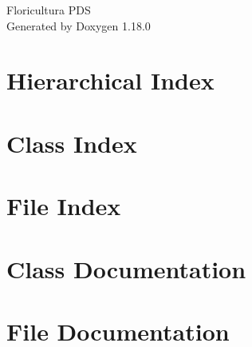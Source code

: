 \documentclass[twoside]{book}
\newcommand{\+}{\discretionary{\mbox{\scriptsize$\hookleftarrow$}}{}{}}
\newcommand{\clearemptydoublepage}{%
    \newpage{\pagestyle{empty}\cleardoublepage}%
  }
\begin{document}
  \raggedbottom
    \hypersetup{pageanchor=false,
                bookmarksnumbered=true,
                pdfencoding=unicode
               }
  \begin{titlepage}
  \vspace*{7cm}
  \begin{center}%
  {\Large Floricultura PDS}\\
  \vspace*{1cm}
  {\large Generated by Doxygen 1.18.0}\\
  \end{center}
  \end{titlepage}
  \clearemptydoublepage
  \tableofcontents
  \clearemptydoublepage
  \hypersetup{pageanchor=true}
\chapter{Hierarchical Index}

\chapter{Class Index}

\chapter{File Index}

\chapter{Class Documentation}














\chapter{File Documentation}























  \backmatter
  \newpage
  \clearemptydoublepage
  \printindex
\end{document}
